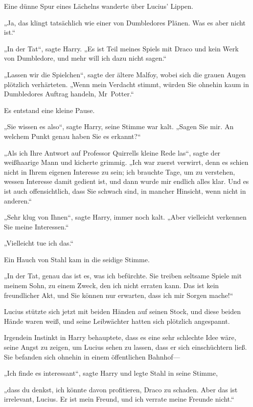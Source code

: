 {Eine dünne Spur eines Lächelns wanderte über Lucius' Lippen.

„Ja, das klingt tatsächlich wie einer von Dumbledores Plänen. Was es aber nicht ist.“

„In der Tat“, sagte Harry. „Es ist Teil meines Spiels mit Draco und kein Werk von Dumbledore, und mehr will ich dazu nicht sagen.“

„Lassen wir die Spielchen“, sagte der ältere Malfoy, wobei sich die grauen Augen plötzlich verhärteten. „Wenn mein Verdacht stimmt, würden Sie ohnehin kaum in Dumbledores Auftrag handeln, Mr~Potter.“

Es entstand eine kleine Pause.

„Sie wissen es also“, sagte Harry, seine Stimme war kalt. „Sagen Sie mir. An welchem Punkt genau haben Sie es erkannt?“

„Als ich Ihre Antwort auf Professor Quirrells kleine Rede las“, sagte der weißhaarige Mann und kicherte grimmig. „Ich war zuerst verwirrt, denn es schien nicht in Ihrem eigenen Interesse zu sein; ich brauchte Tage, um zu verstehen, wessen Interesse damit gedient ist, und dann wurde mir endlich alles klar. Und es ist auch offensichtlich, dass Sie schwach sind, in mancher Hinsicht, wenn nicht in anderen.“

„Sehr klug von Ihnen“, sagte Harry, immer noch kalt. „Aber vielleicht verkennen Sie meine Interessen.“

„Vielleicht tue ich das.“

Ein Hauch von Stahl kam in die seidige Stimme.

„In der Tat, genau das ist es, was ich befürchte. Sie treiben seltsame Spiele mit meinem Sohn, zu einem Zweck, den ich nicht erraten kann. Das ist kein freundlicher Akt, und Sie können nur erwarten, dass ich mir Sorgen mache!“

Lucius stützte sich jetzt mit beiden Händen auf seinen Stock, und diese beiden Hände waren weiß, und seine Leibwächter hatten sich plötzlich angespannt.

Irgendein Instinkt in Harry behauptete, dass es eine sehr schlechte Idee wäre, seine Angst zu zeigen, um Lucius sehen zu lassen, dass er sich einschüchtern ließ. Sie befanden sich ohnehin in einem öffentlichen Bahnhof—

„Ich finde es interessant“, sagte Harry und legte Stahl in seine Stimme,

„dass du denkst, ich könnte davon profitieren, Draco zu schaden. Aber das ist irrelevant, Lucius. Er ist mein Freund, und ich verrate meine Freunde nicht.“

}
